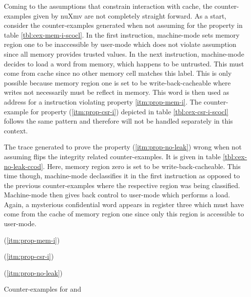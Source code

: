 Coming to the assumptions that constrain interaction with cache, the counter-examples given by nuXmv are not completely straight forward.
As a start, consider the counter-examples generated when not assuming  for the  property in table \ref{tbl:cex-mem-i-scocl}.
In the first instruction, machine-mode sets memory region one to be inaccessible by user-mode which does not violate assumption  since all memory provides trusted values.
In the next instruction, machine-mode decides to load a word from memory, which happens to be untrusted.
This must come from cache since no other memory cell matches this label.
This is only possible because memory region one is set to be write-back-cacheable where writes not necessarily must be reflect in memory.
This word is then used as address for a  instruction violating property \ref{itm:prop-mem-i}.
The counter-example for property  (\ref{itm:prop-csr-i}) depicted in table \ref{tbl:cex-csr-i-scocl} follows the same pattern and therefore will not be handled separately in this context.

The trace generated to prove the  property (\ref{itm:prop-no-leak}) wrong when not assuming  flips the integrity related counter-examples.
It is given in table \ref{tbl:cex-no-leak-ccod}.
Here, memory region zero is set to be write-back-cacheable.
This time though, machine-mode declassifies it in the first instruction as opposed to the previous counter-examples where the respective region was being classified.
Machine-mode then gives back control to user-mode which performs a load.
Again, a mysterious confidential word appears in register three which must have come from the cache of memory region one since only this region is accessible to user-mode.

\begin{table}
    \begin{subtable}{\textwidth}
        \centering
        
        \caption{ (\ref{itm:prop-mem-i})}
        \label{tbl:cex-mem-i-scocl}
    \end{subtable}

    \begin{subtable}{\textwidth}
        \centering
        
        \caption{ (\ref{itm:prop-csr-i})}
        \label{tbl:cex-csr-i-scocl}
    \end{subtable}

    \begin{subtable}{\textwidth}
        \centering
        
        \caption{ (\ref{itm:prop-no-leak})}
        \label{tbl:cex-no-leak-ccod}
    \end{subtable}
    \caption{Counter-examples for  and }
\end{table}

